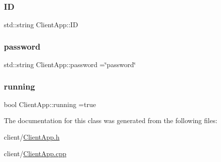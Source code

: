 \mbox{\label{class_client_app_a530ab72352f51275d34354decf8075d4}} 
\subsubsection{\texorpdfstring{ID}{ID}}
{\footnotesize\ttfamily std\+::string Client\+App\+::\+ID}

\mbox{\label{class_client_app_a6fe703fe3bfd4f061d276751b5b0194a}} 
\subsubsection{\texorpdfstring{password}{password}}
{\footnotesize\ttfamily std\+::string Client\+App\+::password =\char`\"{}password\char`\"{}}

\mbox{\label{class_client_app_a27d8d49b10a6a5849d747a99bd4c5646}} 
\subsubsection{\texorpdfstring{running}{running}}
{\footnotesize\ttfamily bool Client\+App\+::running =true}



The documentation for this class was generated from the following files\+:\begin{DoxyCompactItemize}
\item 
client/\hyperlink{_client_app_8h}{Client\+App.\+h}\item 
client/\hyperlink{_client_app_8cpp}{Client\+App.\+cpp}\end{DoxyCompactItemize}
